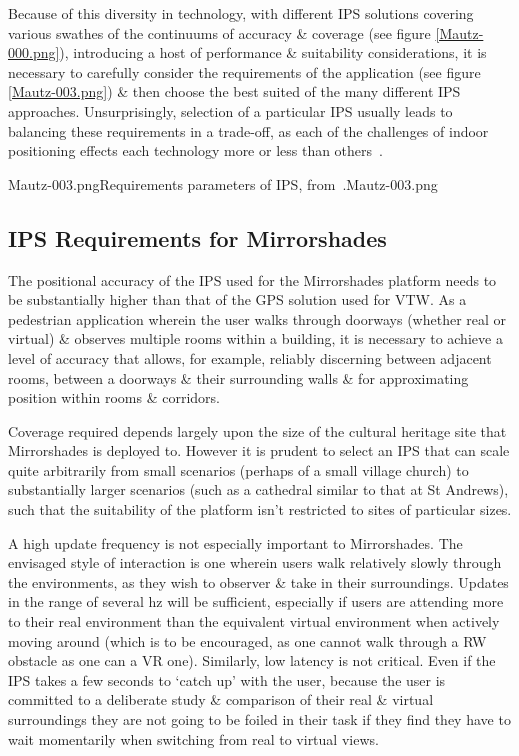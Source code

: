 Because of this diversity in technology, with different IPS solutions covering various swathes of the continuums of accuracy \& coverage (see figure \ref{Mautz-000.png}), introducing a host of performance \& suitability considerations, it is necessary to carefully consider the requirements of the application (see figure \ref{Mautz-003.png}) \& then choose the best suited of the many different IPS approaches. Unsurprisingly, selection of a particular IPS usually leads to balancing these requirements in a trade-off, as each of the challenges of indoor positioning effects each technology more or less than others~\cite{Mautz2009}.

       {Mautz-003.png}{Requirements parameters of IPS, from~\cite{Mautz2012}.}{Mautz-003.png}


\subsection{IPS Requirements for Mirrorshades}
The positional accuracy of the IPS used for the Mirrorshades platform needs to be substantially higher than that of the GPS solution used for VTW. As a pedestrian application wherein the user walks through doorways (whether real or virtual) \& observes multiple rooms within a building, it is necessary to achieve a level of accuracy that allows, for example, reliably discerning between adjacent rooms, between a doorways \& their surrounding walls \& for approximating position within rooms \& corridors.

Coverage required depends largely upon the size of the cultural heritage site that Mirrorshades is deployed to. However it is prudent to select an IPS that can scale quite arbitrarily from small scenarios (perhaps of a small village church) to substantially larger scenarios (such as a cathedral similar to that at St Andrews), such that the suitability of the platform isn't restricted to sites of particular sizes.

A high update frequency is not especially important to Mirrorshades. The envisaged style of interaction is one wherein users walk relatively slowly through the environments, as they wish to observer \& take in their surroundings. Updates in the range of several hz will be sufficient, especially if users are attending more to their real environment than the equivalent virtual environment when actively moving around (which is to be encouraged, as one cannot walk through a RW obstacle as one can a VR one). Similarly, low latency is not critical. Even if the IPS takes a few seconds to `catch up' with the user, because the user is committed to a deliberate study \& comparison of their real \& virtual surroundings they are not going to be foiled in their task if they find they have to wait momentarily when switching from real to virtual views.

